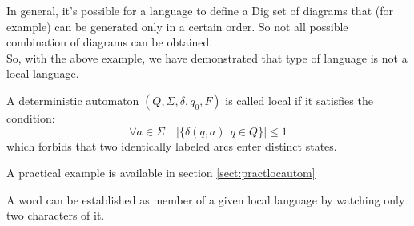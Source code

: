 			In general, it's possible for a language to define a Dig set of diagrams that (for example) can be generated only in a certain order.
			So not all possible combination of diagrams can be obtained.\\
			So, with the above example, we have demonstrated that type of language is not a local language.
			\begin{definition}\label{def:loclang}
				A deterministic automaton $(Q, \Sigma, \delta, q_0 , F)$ is called local if it satisfies the condition:
				$$\forall a \in \Sigma \quad \lvert \{ \delta(q, a) : q \in Q \} \rvert \leq 1$$
				which forbids that two identically labeled arcs enter distinct states.
			\end{definition}
			A practical example is available in section \ref{sect:practlocautom}

			\begin{property}
				A word can be established as member of a given local language by watching only two characters of it. 
			\end{property}
